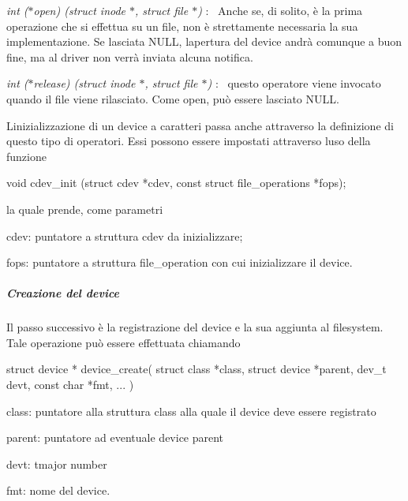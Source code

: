 \begin{DoxyItemize}
\item {\itshape int ($\ast$open) (struct inode $\ast$, struct file $\ast$)} \+:~\newline
 Anche se, di solito, è la prima operazione che si effettua su un file, non è strettamente necessaria la sua implementazione. Se lasciata N\+U\+LL, l\textquotesingle{}apertura del device andrà comunque a buon fine, ma al driver non verrà inviata alcuna notifica.
\item {\itshape int ($\ast$release) (struct inode $\ast$, struct file $\ast$)} \+:~\newline
 questo operatore viene invocato quando il file viene rilasciato. Come open, può essere lasciato N\+U\+LL.
\end{DoxyItemize}

L\textquotesingle{}inizializzazione di un device a caratteri passa anche attraverso la definizione di questo tipo di operatori. Essi possono essere impostati attraverso l\textquotesingle{}uso della funzione 
\begin{DoxyCode}
\textcolor{keywordtype}{void} cdev\_init (\textcolor{keyword}{struct} cdev *cdev, \textcolor{keyword}{const} \textcolor{keyword}{struct} file\_operations *fops);
\end{DoxyCode}
 la quale prende, come parametri
\begin{DoxyItemize}
\item cdev\+: puntatore a struttura cdev da inizializzare;
\item fops\+: puntatore a struttura file\+\_\+operation con cui inizializzare il device.
\end{DoxyItemize}

\subparagraph*{Creazione del device}

Il passo successivo è la registrazione del device e la sua aggiunta al filesystem. Tale operazione può essere effettuata chiamando 
\begin{DoxyCode}
\textcolor{keyword}{struct }device * device\_create( \textcolor{keyword}{struct} \textcolor{keyword}{class} *\textcolor{keyword}{class}, \textcolor{keyword}{struct} device *parent, dev\_t devt, \textcolor{keyword}{const} \textcolor{keywordtype}{char} *fmt, ...
      )
\end{DoxyCode}

\begin{DoxyItemize}
\item class\+: puntatore alla struttura class alla quale il device deve essere registrato
\item parent\+: puntatore ad eventuale device parent
\item devt\+: tmajor number
\item fmt\+: nome del device.
\end{DoxyItemize}

